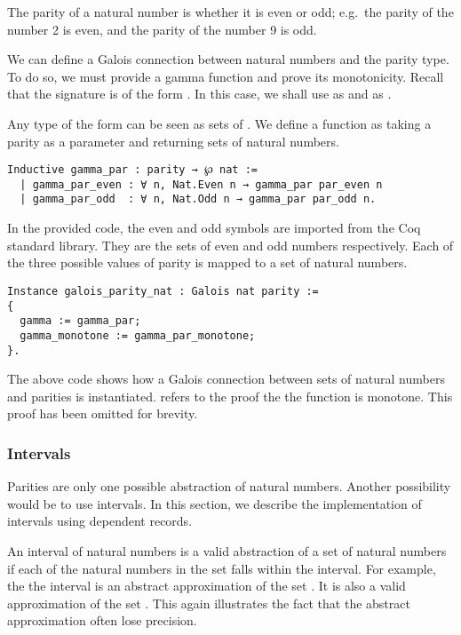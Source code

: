 The parity of a natural number is whether it is even or odd; e.g.\ the parity
of the number 2 is even, and the parity of the number 9 is odd. 

We can define a Galois connection between natural numbers and the parity type.
To do so, we must provide a gamma function and prove its monotonicity. Recall
that the signature is of the form . In this
case, we shall use  as  and  as .

Any type of the form  can be seen as sets of . We define
a function  as taking a parity as a parameter and returning
sets of natural numbers.

\begin{listing}
\begin{verbatim}
Inductive gamma_par : parity → ℘ nat :=
  | gamma_par_even : ∀ n, Nat.Even n → gamma_par par_even n
  | gamma_par_odd  : ∀ n, Nat.Odd n → gamma_par par_odd n.
\end{verbatim}
\end{listing}

In the provided code, the even and odd symbols are imported from the Coq
standard library. They are the sets of even and odd numbers respectively. Each
of the three possible values of parity is mapped to a set of natural numbers.

\begin{listing}
\begin{verbatim}
Instance galois_parity_nat : Galois nat parity :=
{
  gamma := gamma_par;
  gamma_monotone := gamma_par_monotone;
}.
\end{verbatim}
\end{listing}

The above code shows how a Galois connection between sets of natural numbers 
and parities is instantiated.  refers to the proof the
the  function is monotone. This proof has been omitted for 
brevity.

\subsubsection{Intervals}
Parities are only one possible abstraction of natural numbers. Another
possibility would be to use intervals. In this section, we describe the
implementation of intervals using dependent records.

An interval of natural numbers is a valid abstraction of a set of natural
numbers if each of the natural numbers in the set falls within the interval.
For example, the the interval \coq{[1,5] } is an abstract approximation of the set
. It is also a valid approximation of the set . 
This again illustrates the fact that the abstract approximation often lose 
precision.

